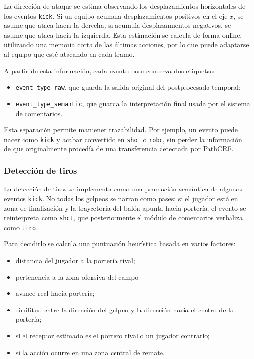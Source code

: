 La dirección de ataque se estima observando los desplazamientos horizontales de los eventos \texttt{kick}. Si un equipo acumula desplazamientos positivos en el eje \(x\), se asume que ataca hacia la derecha; si acumula desplazamientos negativos, se asume que ataca hacia la izquierda. Esta estimación se calcula de forma online, utilizando una memoria corta de las últimas acciones, por lo que puede adaptarse al equipo que esté atacando en cada tramo.

A partir de esta información, cada evento base conserva dos etiquetas:

\begin{itemize}
    \item \texttt{event\_type\_raw}, que guarda la salida original del postprocesado temporal;
    \item \texttt{event\_type\_semantic}, que guarda la interpretación final usada por el sistema de comentarios.
\end{itemize}

Esta separación permite mantener trazabilidad. Por ejemplo, un evento puede nacer como \texttt{kick} y acabar convertido en \texttt{shot} o \texttt{robo}, sin perder la información de que originalmente procedía de una transferencia detectada por PathCRF.

\subsubsection{Detección de tiros}

La detección de tiros se implementa como una promoción semántica de algunos eventos \texttt{kick}. No todos los golpeos se narran como pases: si el jugador está en zona de finalización y la trayectoria del balón apunta hacia portería, el evento se reinterpreta como \texttt{shot}, que posteriormente el módulo de comentarios verbaliza como \texttt{tiro}.

Para decidirlo se calcula una puntuación heurística basada en varios factores:

\begin{itemize}
    \item distancia del jugador a la portería rival;
    \item pertenencia a la zona ofensiva del campo;
    \item avance real hacia portería;
    \item similitud entre la dirección del golpeo y la dirección hacia el centro de la portería;
    \item si el receptor estimado es el portero rival o un jugador contrario;
    \item si la acción ocurre en una zona central de remate.
\end{itemize}

